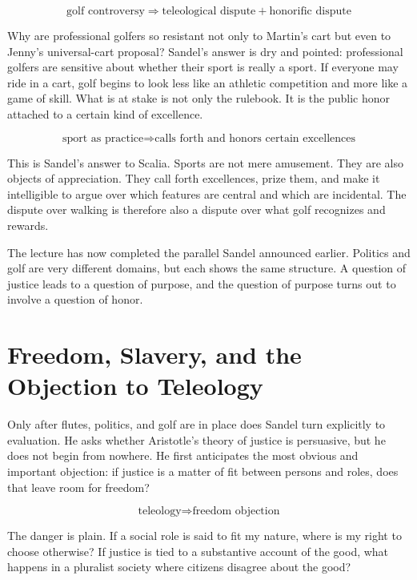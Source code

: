 \begin{equation}
\text{golf controversy}
\Longrightarrow
\text{teleological dispute}+\text{honorific dispute}
\end{equation}

Why are professional golfers so resistant not only to Martin's cart but even to Jenny's universal-cart proposal? Sandel's answer is dry and pointed: professional golfers are sensitive about whether their sport is really a sport. If everyone may ride in a cart, golf begins to look less like an athletic competition and more like a game of skill. What is at stake is not only the rulebook. It is the public honor attached to a certain kind of excellence.

\begin{equation}
\text{sport as practice}
\Longrightarrow
\text{calls forth and honors certain excellences}
\end{equation}

This is Sandel's answer to Scalia. Sports are not mere amusement. They are also objects of appreciation. They call forth excellences, prize them, and make it intelligible to argue over which features are central and which are incidental. The dispute over walking is therefore also a dispute over what golf recognizes and rewards.

The lecture has now completed the parallel Sandel announced earlier. Politics and golf are very different domains, but each shows the same structure. A question of justice leads to a question of purpose, and the question of purpose turns out to involve a question of honor.

\section{Freedom, Slavery, and the Objection to Teleology}

Only after flutes, politics, and golf are in place does Sandel turn explicitly to evaluation. He asks whether Aristotle's theory of justice is persuasive, but he does not begin from nowhere. He first anticipates the most obvious and important objection: if justice is a matter of fit between persons and roles, does that leave room for freedom?

\begin{equation}
\text{teleology}
\Longrightarrow
\text{freedom objection}
\end{equation}

The danger is plain. If a social role is said to fit my nature, where is my right to choose otherwise? If justice is tied to a substantive account of the good, what happens in a pluralist society where citizens disagree about the good?

